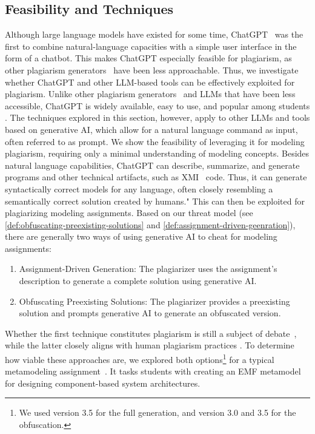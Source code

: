 \subsection{Feasibility and Techniques}
Although large language models have existed for some time, ChatGPT~\cite{ChatGPT} was the first to combine natural-language capacities with a simple user interface in the form of a chatbot.
This makes ChatGPT especially feasible for plagiarism, as other plagiarism generators~\cite{DevoreMcDonald2020} have been less approachable.
Thus, we investigate whether ChatGPT and other \ac{LLM}-based tools can be effectively exploited for plagiarism.
Unlike other plagiarism generators~\cite{DevoreMcDonald2020} and \acp{LLM} that have been less accessible, ChatGPT is widely available, easy to use, and popular among students \cite{ChatGPTGuide}. The techniques explored in this section, however, apply to other \acp{LLM} and tools based on generative AI, which allow for a natural language command as input, often referred to as prompt.
We show the feasibility of leveraging it for modeling plagiarism, requiring only a minimal understanding of modeling concepts.
%
Besides natural language capabilities, ChatGPT can describe, summarize, and generate programs and other technical artifacts, such as \ac{XMI}~\cite{Daun2023} code.
Thus, it can generate syntactically correct models for any language, often closely resembling a semantically correct solution created by humans." This can then be exploited for plagiarizing modeling assignments.
Based on our threat model (see \autoref{def:obfuscating-preexisting-solutions} and \autoref{def:assignment-driven-geenration}), there are generally two ways of using generative AI to cheat for modeling assignments:
\begin{enumerate}
    \item Assignment-Driven Generation: The plagiarizer uses the assignment's description to generate a complete solution using generative AI.
    \item Obfuscating Preexisting Solutions: The plagiarizer provides a preexisting solution and prompts generative AI to generate an obfuscated version.
\end{enumerate}
Whether the first technique constitutes plagiarism is still a subject of debate~\cite{Anders2023}, while the latter closely aligns with human plagiarism practices \cite{Novak2019}.
To determine how viable these approaches are, we explored both options\footnote{We used version 3.5 for the full generation, and version 3.0 and 3.5 for the obfuscation.} for a typical~\cite{Ciccozzi2018} metamodeling assignment~\cite{Saglam2022}.
It tasks students with creating an \ac{EMF} metamodel for designing component-based system architectures.

